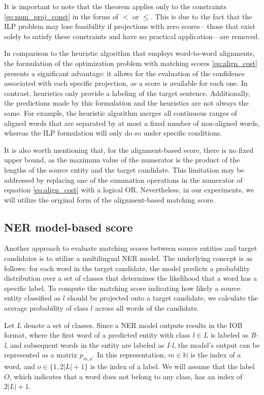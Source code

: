 It is important to note that the theorem applies only to the constraints
\eqref{eq:num_proj_const} in the forms of \( < \) or \( \leq \). This is due to
the fact that the ILP problem may lose feasibility if projections with zero
scores—those that exist solely to satisfy these constraints and have no practical
application—are removed.

In comparison to the heuristic algorithm that employs word-to-word alignments,
the formulation of the optimization problem with matching scores \eqref{eq:align_cost}
presents a significant advantage: it allows for the evaluation of the confidence
associated with each specific projection, as a score is available for each one.
In contrast, heuristics only provide a labeling of the target sentence. Additionally,
the predictions made by this formulation and the heuristics are not always the same.
For example, the heuristic algorithm merges all continuous ranges of aligned words
that are separated by at most a fixed number of non-aligned words, whereas the
ILP formulation will only do so under specific conditions.

It is also worth mentioning that, for the alignment-based score, there is no fixed
upper bound, as the maximum value of the numerator is the product of the lengths of
the source entity and the target candidate. This limitation may be addressed by
replacing one of the summation operations in the numerator of equation
\eqref{eq:align_cost} with a logical OR. Nevertheless, in our experiments, we will
utilize the original form of the alignment-based matching score.

\subsection{NER model-based score}

Another approach to evaluate matching scores between source entities
and target candidates is to utilize a multilingual NER model.
The underlying concept is as follows: for each word in the target
candidate, the model predicts a probability distribution over a
set of classes that determines the likelihood that a word has a
specific label. To compute the matching score indicating how likely a source
entity classified as \( l \) should be projected onto a target candidate,
we calculate the average probability of class \( l \) across all words of
the candidate.

Let \( L \) denote a set of classes. Since a NER model outputs results in the IOB format,
where the first word of a predicted entity with class \( l \in L \) is labeled as
\textit{B-l}, and subsequent words in the entity are labeled as \textit{I-l}, the
model's output can be represented as a matrix \( p_{m, o} \). In this representation,
\( m \in \mathbb{N} \) is the index of a word, and \( o \in \{ 1, 2|L| + 1 \} \) is the
index of a label. We will assume that the label \( O \), which indicates that a word does not
belong to any class, has an index of \( 2|L| + 1 \).

